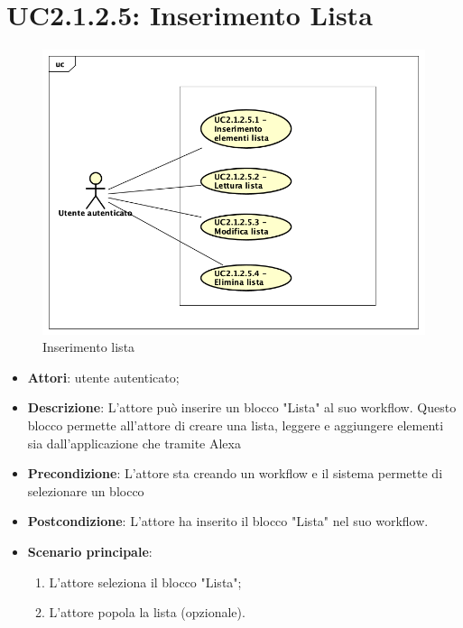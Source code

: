 \section{UC2.1.2.5: Inserimento Lista}
\label{UC2.1.2.5}
\begin{figure}[h]
	\centering
	\includegraphics[scale=0.5]{Diagram/Lista.png}
	\caption{Inserimento lista}\label{}
\end{figure}
\begin{itemize}
	\item \textbf{Attori}: utente autenticato;
	\item \textbf{Descrizione}: L'attore può inserire un blocco "Lista" al suo workflow. Questo blocco permette all'attore di creare una lista, leggere e aggiungere elementi sia dall'applicazione che tramite Alexa
	\item \textbf{Precondizione}: L'attore sta creando un workflow e il sistema permette di selezionare un blocco
	\item \textbf{Postcondizione}: L'attore ha inserito il blocco "Lista" nel suo workflow.
	\item \textbf{Scenario principale}:
	\begin{enumerate} \item L'attore seleziona il blocco "Lista";  \item  L'attore popola la lista (opzionale).\end{enumerate}
\end{itemize}

